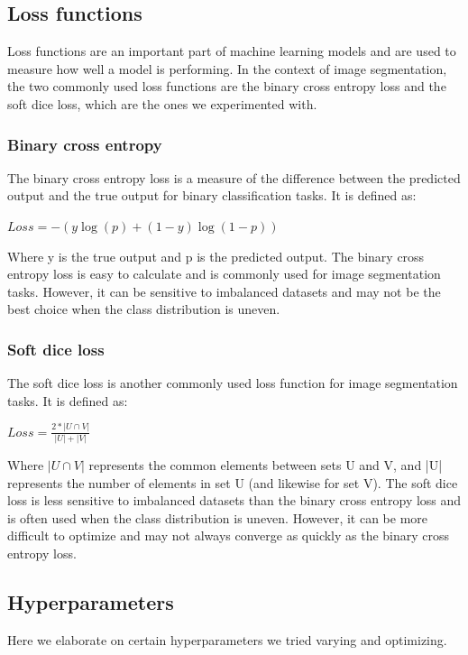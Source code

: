 \documentclass[10pt,conference,compsocconf]{IEEEtran}
\begin{document}
\subsection{Loss functions}
Loss functions are an important part of machine learning models and are used to measure how well a model is performing. In the context of image segmentation, the two commonly used loss functions are the binary cross entropy loss and the soft dice loss, which are the ones we experimented with.
\subsubsection{Binary cross entropy}
The binary cross entropy loss is a measure of the difference between the predicted output and the true output for binary classification tasks. It is defined as:
\vspace{-0.075in}
\begin{center}
$Loss = -{(y\log(p) + (1 - y)\log(1 - p))}$
\end{center}

Where y is the true output and p is the predicted output. The binary cross entropy loss is easy to calculate and is commonly used for image segmentation tasks. However, it can be sensitive to imbalanced datasets and may not be the best choice when the class distribution is uneven.
\subsubsection{Soft dice loss}
The soft dice loss is another commonly used loss function for image segmentation tasks. It is defined as:
\vspace{-0.1in}
\begin{center}
$Loss = \frac{2*|U \cap V|}{|U| + |V|}$
\end{center}
Where ${|U \cap V|}$ represents the common elements between sets U and V, and |U| represents the number of elements in set U (and likewise for set V). The soft dice loss is less sensitive to imbalanced datasets than the binary cross entropy loss and is often used when the class distribution is uneven. However, it can be more difficult to optimize and may not always converge as quickly as the binary cross entropy loss.
\subsection{Hyperparameters}
Here we elaborate on certain hyperparameters we tried varying and optimizing.
\end{document}
